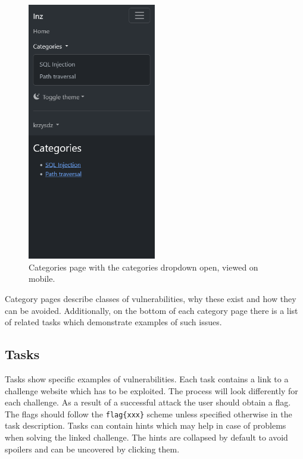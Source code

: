 \begin{figure}
    \centering
    \includegraphics[width=0.5\textwidth]{img/manual-categories.png}
    \caption{Categories page with the categories dropdown open, viewed on mobile.}
    \label{fig:manual-categories}
\end{figure}

Category pages describe classes of vulnerabilities, why these exist and how they can be avoided. Additionally, on the bottom of each category page there is a list of related tasks which demonstrate examples of such issues.

\subsection{Tasks}

Tasks show specific examples of vulnerabilities. Each task contains a link to a challenge website which has to be exploited. The process will look differently for each challenge. As a result of a successful attack the user should obtain a flag. The flags should follow the \texttt{flag\{xxx\}} scheme unless specified otherwise in the task description. Tasks can contain hints which may help in case of problems when solving the linked challenge. The hints are collapsed by default to avoid spoilers and can be uncovered by clicking them.

